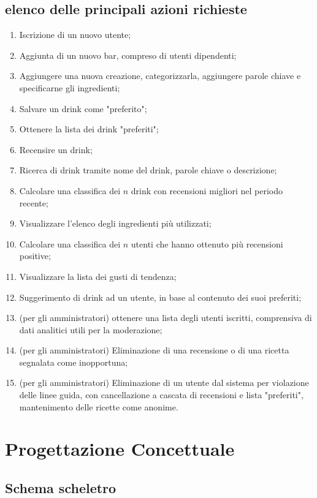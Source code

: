 \documentclass[a4paper,12pt]{report}
\begin{document}
\subsection{elenco delle principali azioni richieste}
\begin{enumerate}
    \item Iscrizione di un nuovo utente;
    \item Aggiunta di un nuovo bar, compreso di utenti dipendenti;
    \item Aggiungere una nuova creazione, categorizzarla, aggiungere parole chiave e specificarne gli ingredienti;
    \item Salvare un drink come "preferito";
    \item Ottenere la lista dei drink "preferiti";
    \item Recensire un drink;
    \item Ricerca di drink tramite nome del drink, parole chiave o descrizione;
    \item Calcolare una classifica dei $n$ drink con recensioni migliori nel periodo recente;
    \item Visualizzare l'elenco degli ingredienti più utilizzati;
    \item Calcolare una classifica dei $n$ utenti che hanno ottenuto più recensioni positive;
    \item Visualizzare la lista dei gusti di tendenza;

    
    \item Suggerimento di drink ad un utente, in base al contenuto dei suoi preferiti;   
    \item (per gli amministratori) ottenere una lista degli utenti iscritti, comprensiva di dati analitici utili per la moderazione;
    \item (per gli amministratori) Eliminazione di una recensione o di una ricetta segnalata come inopportuna;    
    \item (per gli amministratori) Eliminazione di un utente dal sistema per violazione delle linee guida, con cancellazione a cascata di recensioni e lista "preferiti", mantenimento delle ricette come anonime.
\end{enumerate}


\newpage
\section{Progettazione Concettuale}


\subsection{Schema scheletro}
\end{document}
